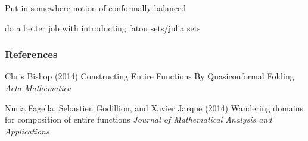 \documentclass{beamer}
\begin{document}
\begin{frame}

Put in somewhere notion of {\color{red} conformally balanced}

do a better job with introducting fatou sets/julia sets

\end{frame}








\begin{frame}
\frametitle{References}
\footnotesize{
\begin{thebibliography}{99} %
  Chris Bishop (2014)
\newblock Constructing Entire Functions By Quasiconformal Folding
\newblock \emph{Acta Mathematica}

 Nuria Fagella, Sebastien Godillion, and Xavier Jarque (2014)
\newblock Wandering domains for composition of entire functions
\newblock \emph{Journal of Mathematical Analysis and Applications} 


\end{thebibliography}
}
\end{frame}


\end{document}
